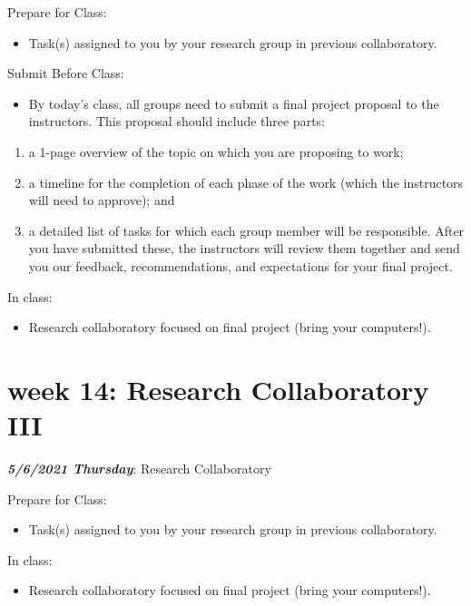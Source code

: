 \documentclass[
]{book}
\providecommand{\tightlist}{%
  \setlength{\itemsep}{0pt}\setlength{\parskip}{0pt}}
\begin{document}
Prepare for Class:

\begin{itemize}
\tightlist
\item
  Task(s) assigned to you by your research group in previous collaboratory.
\end{itemize}

Submit Before Class:

\begin{itemize}
\tightlist
\item
  By today's class, all groups need to submit a final project proposal to the instructors. This proposal should include three parts:
\end{itemize}

\begin{enumerate}
\def\labelenumi{(\arabic{enumi})}
\tightlist
\item
  a 1-page overview of the topic on which you are proposing to work;
\item
  a timeline for the completion of each phase of the work (which the instructors will need to approve); and
\item
  a detailed list of tasks for which each group member will be responsible. After you have submitted these, the instructors will review them together and send you our feedback, recommendations, and expectations for your final project.
\end{enumerate}

In class:

\begin{itemize}
\tightlist
\item
  Research collaboratory focused on final project (bring your computers!).
\end{itemize}

\hypertarget{week-14-research-collaboratory-iii-1}{%
\chapter{week 14: Research Collaboratory III}\label{week-14-research-collaboratory-iii-1}}

\textbf{\emph{5/6/2021 Thursday}}: Research Collaboratory

Prepare for Class:

\begin{itemize}
\tightlist
\item
  Task(s) assigned to you by your research group in previous collaboratory.
\end{itemize}

In class:

\begin{itemize}
\tightlist
\item
  Research collaboratory focused on final project (bring your computers!).
\end{itemize}

  
\end{document}
